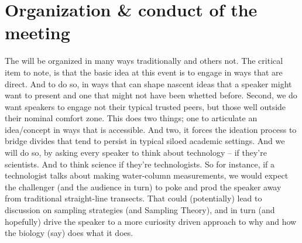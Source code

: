 \section{Organization \& conduct of the meeting}

The \symp will be organized in many ways traditionally and others
not. The critical item to note, is that the basic idea at this event is
to engage in ways that are direct. And to do so, in ways that can shape
nascent ideas that a speaker might want to present and one that might
not have been whetted before. Second, we do want speakers to engage not
their typical trusted peers, but those well outside their nominal
comfort zone. This does two things; one to articulate an idea/concept in
ways that is accessible. And two, it forces the ideation process to
bridge divides that tend to persist in typical siloed academic
settings. And we will do so, by asking every speaker to think about
technology -- if they're scientists. And to think science if they're
technologists. So for instance, if a technologist talks about making
water-column measurements, we would expect the challenger (and the
audience in turn) to poke and prod the speaker away from traditional
straight-line transects. That could (potentially) lead to discussion on
sampling strategies (and Sampling Theory), and in turn (and hopefully)
drive the speaker to a more curiosity driven approach to why and how the
biology (say) does what it does.


